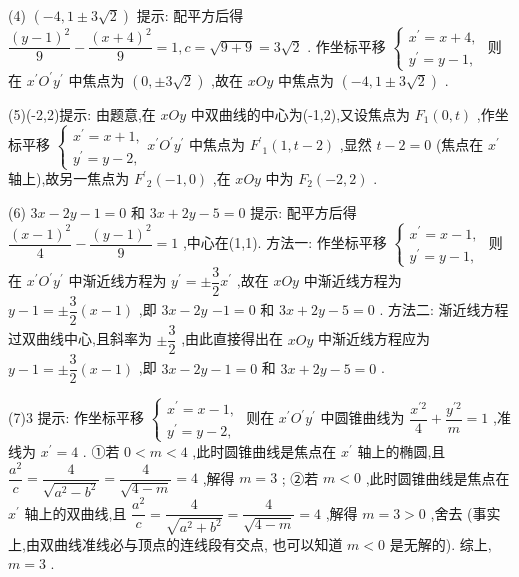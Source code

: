 (4) $\left( {-4,1 \pm  3\sqrt{2}}\right)$ 提示: 配平方后得 $\dfrac{{\left( y - 1\right) }^{2}}{9} - \dfrac{{\left( x + 4\right) }^{2}}{9} = 1,c = \sqrt{9 + 9} = 3\sqrt{2}$ . 作坐标平移 $\left\{  \begin{array}{l} {x}^{\prime } = x + 4, \\  {y}^{\prime } = y - 1, \end{array}\right.$ 则在 ${x}^{\prime }{O}^{\prime }{y}^{\prime }$ 中焦点为 $\left( {0, \pm  3\sqrt{2}}\right)$ ,故在 ${xOy}$ 中焦点为 $\left( {-4,1 \pm  3\sqrt{2}}\right)$ .

(5)(-2,2)提示: 由题意,在 ${xOy}$ 中双曲线的中心为(-1,2),又设焦点为 ${F}_{1}\left( {0,t}\right)$ ,作坐标平移 $\left\{  {\begin{array}{l} {x}^{\prime } = x + 1, \\  {y}^{\prime } = y - 2, \end{array}{x}^{\prime }{O}^{\prime }{y}^{\prime }}\right.$ 中焦点为 ${F}^{\prime }{}_{1}\left( {1,t - 2}\right)$ ,显然 $t - 2 = 0$ (焦点在 ${x}^{\prime }$ 轴上),故另一焦点为 ${F}^{\prime }{}_{2}\left( {-1,0}\right)$ ,在 ${xOy}$ 中为 ${F}_{2}\left( {-2,2}\right)$ .

(6) ${3x} - {2y} - 1 = 0$ 和 ${3x} + {2y} - 5 = 0$ 提示: 配平方后得 $\dfrac{{\left( x - 1\right) }^{2}}{4} - \dfrac{{\left( y - 1\right) }^{2}}{9} = 1$ ,中心在(1,1). 方法一: 作坐标平移 $\left\{  \begin{array}{l} {x}^{\prime } = x - 1, \\  {y}^{\prime } = y - 1, \end{array}\right.$ 则在 ${x}^{\prime }{O}^{\prime }{y}^{\prime }$ 中渐近线方程为 ${y}^{\prime } =  \pm  \dfrac{3}{2}{x}^{\prime }$ ,故在 ${xOy}$ 中渐近线方程为 $y - 1 =  \pm  \dfrac{3}{2}\left( {x - 1}\right)$ ,即 ${3x} - {2y}$  $- 1 = 0$ 和 ${3x} + {2y} - 5 = 0$ . 方法二: 渐近线方程过双曲线中心,且斜率为 $\pm  \dfrac{3}{2}$ ,由此直接得出在 ${xOy}$ 中渐近线方程应为 $y - 1 =  \pm  \dfrac{3}{2}\left( {x - 1}\right)$ ,即 ${3x} - {2y} - 1 = 0$ 和 ${3x} + {2y} - 5 = 0$ .

(7)3 提示: 作坐标平移 $\left\{  \begin{array}{l} {x}^{\prime } = x - 1, \\  {y}^{\prime } = y - 2, \end{array}\right.$ 则在 ${x}^{\prime }{O}^{\prime }{y}^{\prime }$ 中圆锥曲线为 $\dfrac{{x}^{\prime 2}}{4} + \dfrac{{y}^{\prime 2}}{m} = 1$ ,准线为 ${x}^{\prime } = 4$ . ①若 $0 < m < 4$ ,此时圆锥曲线是焦点在 ${x}^{\prime }$ 轴上的椭圆,且 $\dfrac{{a}^{2}}{c} = \dfrac{4}{\sqrt{{a}^{2} - {b}^{2}}} = \dfrac{4}{\sqrt{4 - m}} = 4$ ,解得 $m = 3$ ; ②若 $m < 0$ ,此时圆锥曲线是焦点在 ${x}^{\prime }$ 轴上的双曲线,且 $\dfrac{{a}^{2}}{c} = \dfrac{4}{\sqrt{{a}^{2} + {b}^{2}}} = \dfrac{4}{\sqrt{4 - m}} = 4$ ,解得 $m = 3 > 0$ ,舍去 (事实上,由双曲线准线必与顶点的连线段有交点, 也可以知道 $m < 0$ 是无解的). 综上, $m = 3$ .

